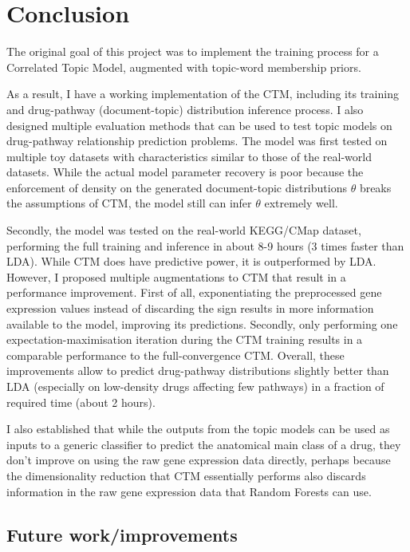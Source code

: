 \documentclass[12pt,a4paper,twoside,openright]{report}
\begin{document}
\chapter{Conclusion}

The original goal of this project was to implement the training process for a Correlated Topic Model, augmented with topic-word membership priors.

As a result, I have a working implementation of the CTM, including its training and drug-pathway (document-topic) distribution inference process. I also designed multiple evaluation methods that can be used to test topic models on drug-pathway relationship prediction problems. The model was first tested on multiple toy datasets with characteristics similar to those of the real-world datasets. While the actual model parameter recovery is poor because the enforcement of density on the generated document-topic distributions $\theta$ breaks the assumptions of CTM, the model still can infer $\theta$ extremely well.

Secondly, the model was tested on the real-world KEGG/CMap dataset, performing the full training and inference in about 8-9 hours (3 times faster than LDA). While CTM does have predictive power, it is outperformed by LDA. However, I proposed multiple augmentations to CTM that result in a performance improvement. First of all, exponentiating the preprocessed gene expression values instead of discarding the sign results in more information available to the model, improving its predictions. Secondly, only performing one expectation-maximisation iteration during the CTM training results in a comparable performance to the full-convergence CTM. Overall, these improvements allow to predict drug-pathway distributions slightly better than LDA (especially on low-density drugs affecting few pathways) in a fraction of required time (about 2 hours).

I also established that while the outputs from the topic models can be used as inputs to a generic classifier to predict the anatomical main class of a drug, they don't improve on using the raw gene expression data directly, perhaps because the dimensionality reduction that CTM essentially performs also discards information in the raw gene expression data that Random Forests can use.

\section{Future work/improvements}
\end{document}
